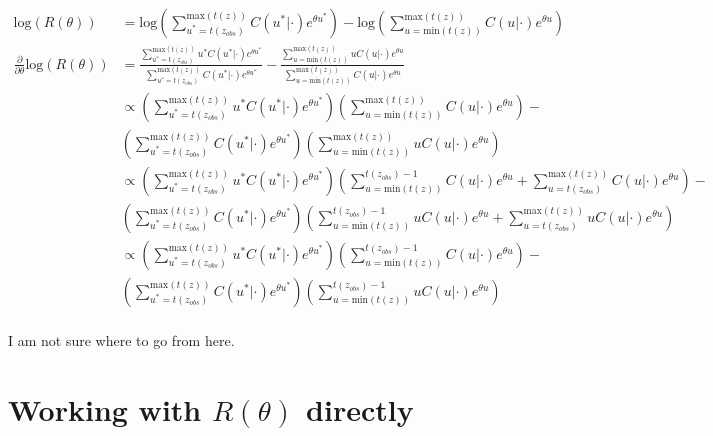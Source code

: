 \documentclass{article}
\begin{document}
\begin{align*}
  \text{log}(R(\theta)) &= 
  \text{log}\left(\sum_{u^*=t(z_{obs})}^{\text{max}(t(z))} C(u^*|\cdot)e^{\theta u^*} \right) - 
  \text{log}\left(\sum_{u=\text{min}(t(z))}^{\text{max}(t(z))} C(u|\cdot)e^{\theta u}\right) \\
  \frac{\partial}{\partial \theta} \text{log}(R(\theta)) &= 
  \frac
  {\sum_{u^*=t(z_{obs})}^{\text{max}(t(z))} u^* C(u^*|\cdot)e^{\theta u^*}}
  {\sum_{u^*=t(z_{obs})}^{\text{max}(t(z))} C(u^*|\cdot)e^{\theta u^*}} -
  \frac
  {\sum_{u=\text{min}(t(z))}^{\text{max}(t(z))} u C(u|\cdot)e^{\theta u}}
  {\sum_{u=\text{min}(t(z))}^{\text{max}(t(z))} C(u|\cdot)e^{\theta u}} \\
  &\propto \left(\sum_{u^*=t(z_{obs})}^{\text{max}(t(z))} u^* C(u^*|\cdot)e^{\theta u^*}\right)
  \left(\sum_{u=\text{min}(t(z))}^{\text{max}(t(z))} C(u|\cdot)e^{\theta u}\right) - \\
  &\left(\sum_{u^*=t(z_{obs})}^{\text{max}(t(z))} C(u^*|\cdot)e^{\theta u^*}\right)
  \left(\sum_{u=\text{min}(t(z))}^{\text{max}(t(z))} u C(u|\cdot)e^{\theta u}\right) \\
  &\propto \left(\sum_{u^*=t(z_{obs})}^{\text{max}(t(z))} u^* C(u^*|\cdot)e^{\theta u^*}\right)
  \left(\sum_{u=\text{min}(t(z))}^{t(z_{obs})-1} C(u|\cdot)e^{\theta u} + \sum_{u=t(z_{obs})}^{\text{max}(t(z))} C(u|\cdot)e^{\theta u}\right) - \\
  &\left(\sum_{u^*=t(z_{obs})}^{\text{max}(t(z))} C(u^*|\cdot)e^{\theta u^*}\right)
  \left(\sum_{u=\text{min}(t(z))}^{t(z_{obs})-1} u C(u|\cdot)e^{\theta u} + \sum_{u=t(z_{obs})}^{\text{max}(t(z))} u C(u|\cdot)e^{\theta u}\right) \\
  &\propto \left(\sum_{u^*=t(z_{obs})}^{\text{max}(t(z))} u^* C(u^*|\cdot)e^{\theta u^*}\right)
  \left(\sum_{u=\text{min}(t(z))}^{t(z_{obs})-1} C(u|\cdot)e^{\theta u}\right) - \\
  &\left(\sum_{u^*=t(z_{obs})}^{\text{max}(t(z))} C(u^*|\cdot)e^{\theta u^*}\right)
  \left(\sum_{u=\text{min}(t(z))}^{t(z_{obs})-1} u C(u|\cdot)e^{\theta u}\right) \\
\end{align*}

I am not sure where to go from here. 

\section{Working with $R(\theta)$ directly}
\end{document}

